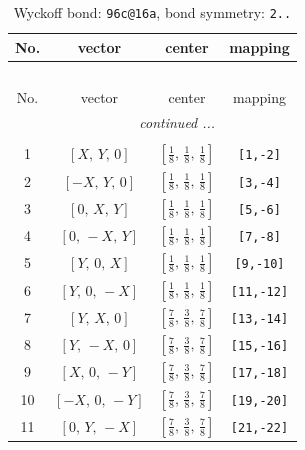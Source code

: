 \documentclass[fleqn,8pt]{jsarticle}
\begin{document}
\begin{longtable}{cccc}
\caption{Wyckoff bond: {\tt 96c@16a}, bond symmetry: {\tt 2..}}
 \\
 \hline \hline
No. & vector & center & mapping \\ \hline \endfirsthead

\multicolumn{3}{l}{\tablename\ \thetable{}} \\
 \hline \hline
No. & vector & center & mapping \\ \hline \endhead

 \hline \hline
\multicolumn{3}{r}{\footnotesize\it continued ...} \\ \endfoot

 \hline \hline
\multicolumn{3}{r}{} \\ \endlastfoot

1 & $\left[ X,\, Y,\, 0 \right]$ & $\left[ \frac{1}{8},\, \frac{1}{8},\, \frac{1}{8} \right]$ & {\tt [1,-2]} \\ \hline
2 & $\left[ - X,\, Y,\, 0 \right]$ & $\left[ \frac{1}{8},\, \frac{1}{8},\, \frac{1}{8} \right]$ & {\tt [3,-4]} \\ \hline
3 & $\left[ 0,\, X,\, Y \right]$ & $\left[ \frac{1}{8},\, \frac{1}{8},\, \frac{1}{8} \right]$ & {\tt [5,-6]} \\ \hline
4 & $\left[ 0,\, - X,\, Y \right]$ & $\left[ \frac{1}{8},\, \frac{1}{8},\, \frac{1}{8} \right]$ & {\tt [7,-8]} \\ \hline
5 & $\left[ Y,\, 0,\, X \right]$ & $\left[ \frac{1}{8},\, \frac{1}{8},\, \frac{1}{8} \right]$ & {\tt [9,-10]} \\ \hline
6 & $\left[ Y,\, 0,\, - X \right]$ & $\left[ \frac{1}{8},\, \frac{1}{8},\, \frac{1}{8} \right]$ & {\tt [11,-12]} \\ \hline
7 & $\left[ Y,\, X,\, 0 \right]$ & $\left[ \frac{7}{8},\, \frac{3}{8},\, \frac{7}{8} \right]$ & {\tt [13,-14]} \\ \hline
8 & $\left[ Y,\, - X,\, 0 \right]$ & $\left[ \frac{7}{8},\, \frac{3}{8},\, \frac{7}{8} \right]$ & {\tt [15,-16]} \\ \hline
9 & $\left[ X,\, 0,\, - Y \right]$ & $\left[ \frac{7}{8},\, \frac{3}{8},\, \frac{7}{8} \right]$ & {\tt [17,-18]} \\ \hline
10 & $\left[ - X,\, 0,\, - Y \right]$ & $\left[ \frac{7}{8},\, \frac{3}{8},\, \frac{7}{8} \right]$ & {\tt [19,-20]} \\ \hline
11 & $\left[ 0,\, Y,\, - X \right]$ & $\left[ \frac{7}{8},\, \frac{3}{8},\, \frac{7}{8} \right]$ & {\tt [21,-22]} \\ \hline

\end{longtable}
\end{document}
